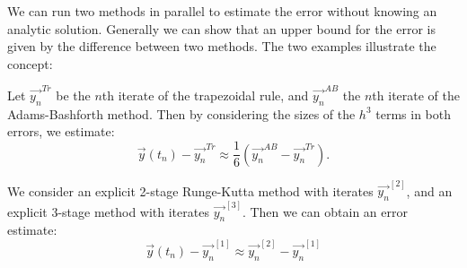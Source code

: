 \documentclass[../Main.tex]{subfiles}
\begin{document}
We can run two methods in parallel to estimate the error without knowing an analytic solution. Generally we can show that an upper bound for the error is given by the difference between two methods. The two examples illustrate the concept:
\begin{example}
    Let $\vec{y_n}^{Tr}$ be the $n$th iterate of the trapezoidal rule, and $\vec{y_{n}}^{AB}$ the $n$th iterate of the Adams-Bashforth method. Then by considering the sizes of the $h^3$ terms in both errors, we estimate:
    \begin{equation*}
        \vec{y}(t_n) - \vec{y_n}^{Tr} \approx \frac16 \left(\vec{y_{n}}^{AB} - \vec{y_{n}}^{Tr}\right).
    \end{equation*}
\end{example}
\begin{example}
    We consider an explicit 2-stage Runge-Kutta method with iterates $\vec{y_n}^{[2]}$, and an explicit 3-stage method with iterates $\vec{y_{n}}^{[3]}$. Then we can obtain an error estimate:
    \begin{equation*}
        \vec{y}(t_{n}) - \vec{y_{n}}^{[1]} \approx \vec{y_{n}}^{[2]} - \vec{y_{n}}^{[1]}
    \end{equation*}
\end{example}
\end{document}
